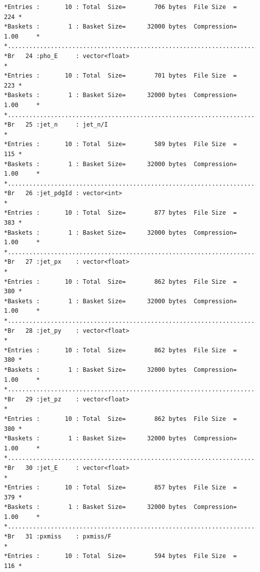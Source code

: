 {\begin{verbatim}
*Entries :       10 : Total  Size=        706 bytes  File Size  =        224 *
*Baskets :        1 : Basket Size=      32000 bytes  Compression=   1.00     *
*............................................................................*
*Br   24 :pho_E     : vector<float>                                          *
*Entries :       10 : Total  Size=        701 bytes  File Size  =        223 *
*Baskets :        1 : Basket Size=      32000 bytes  Compression=   1.00     *
*............................................................................*
*Br   25 :jet_n     : jet_n/I                                                *
*Entries :       10 : Total  Size=        589 bytes  File Size  =        115 *
*Baskets :        1 : Basket Size=      32000 bytes  Compression=   1.00     *
*............................................................................*
*Br   26 :jet_pdgId : vector<int>                                            *
*Entries :       10 : Total  Size=        877 bytes  File Size  =        383 *
*Baskets :        1 : Basket Size=      32000 bytes  Compression=   1.00     *
*............................................................................*
*Br   27 :jet_px    : vector<float>                                          *
*Entries :       10 : Total  Size=        862 bytes  File Size  =        380 *
*Baskets :        1 : Basket Size=      32000 bytes  Compression=   1.00     *
*............................................................................*
*Br   28 :jet_py    : vector<float>                                          *
*Entries :       10 : Total  Size=        862 bytes  File Size  =        380 *
*Baskets :        1 : Basket Size=      32000 bytes  Compression=   1.00     *
*............................................................................*
*Br   29 :jet_pz    : vector<float>                                          *
*Entries :       10 : Total  Size=        862 bytes  File Size  =        380 *
*Baskets :        1 : Basket Size=      32000 bytes  Compression=   1.00     *
*............................................................................*
*Br   30 :jet_E     : vector<float>                                          *
*Entries :       10 : Total  Size=        857 bytes  File Size  =        379 *
*Baskets :        1 : Basket Size=      32000 bytes  Compression=   1.00     *
*............................................................................*
*Br   31 :pxmiss    : pxmiss/F                                               *
*Entries :       10 : Total  Size=        594 bytes  File Size  =        116 *

\end{verbatim}}
